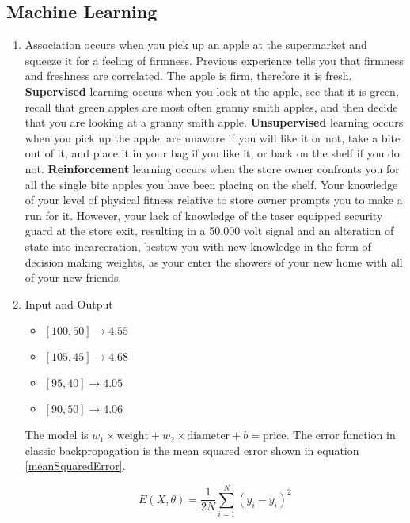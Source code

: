 \documentclass[main.tex]{subfiles}
\begin{document}
\subsection{Machine Learning}
    \begin{enumerate}
        \item Association occurs when you pick up an apple at the supermarket and squeeze it for a feeling of firmness. Previous experience tells you that firmness and freshness are correlated. The apple is firm, therefore it is fresh. \textbf{Supervised} learning occurs when you look at the apple, see that it is green, recall that green apples are most often granny smith apples, and then decide that you are looking at a granny smith apple. \textbf{Unsupervised} learning occurs when you pick up the apple, are unaware if you will like it or not, take a bite out of it, and place it in your bag if you like it, or back on the shelf if you do not. \textbf{Reinforcement} learning occurs when the store owner confronts you for all the single bite apples you have been placing on the shelf. Your knowledge of your level of physical fitness relative to store owner prompts you to make a run for it. However, your lack of knowledge of the taser equipped security guard at the store exit, resulting in a 50,000 volt signal and an alteration of state into incarceration, bestow you with new knowledge in the form of decision making weights, as your enter the showers of your new home with all of your new friends. 
        \item Input and Output
            
            \begin{itemize}[label={}]
                \item $[100,50] \rightarrow 4.55$
                \item $[105,45] \rightarrow 4.68$
                \item $[95,40] \rightarrow 4.05$
                \item $[90,50] \rightarrow 4.06$
            \end{itemize}
        
        The model is $w_1 \times \text{weight} + w_2 \times\text{diameter} + b = \text{price}$. The error function in classic backpropagation is the mean squared error shown in equation \ref{meanSquaredError}. 
        
        \begin{equation} \label{meanSquaredError}
        E(X, \theta)=\frac{1}{2 N} \sum_{i=1}^{N}\left(\hat{y}_{i}-y_{i}\right)^{2}
        \end{equation}
        

\end{enumerate}
\end{document}
